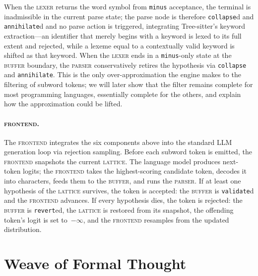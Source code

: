 \documentclass[11pt]{article}
\theoremstyle{plain}
\theoremstyle{definition}
\begin{document}
When the \textsc{lexer} returns the word symbol from \texttt{minus} acceptance,
the terminal is inadmissible in the current parse state; the parse node is
therefore \texttt{collapse}d and \texttt{annihilate}d and no parse action is
triggered, integrating Tree-sitter's keyword extraction---an identifier that
merely begins with a keyword is lexed to its full extent and rejected, while a
lexeme equal to a contextually valid keyword is shifted as that keyword. When
the \textsc{lexer} ends in a \texttt{minus}-only state at the \textsc{buffer}
boundary, the \textsc{parser} conservatively retires the hypothesis via
\texttt{collapse} and \texttt{annihilate}. This is the only over-approximation
the engine makes to the filtering of subword tokens; we will later show that the
filter remains complete for most programming languages, essentially complete for
the others, and explain how the approximation could be lifted.

\paragraph{\textsc{frontend}.} The \textsc{frontend} integrates the six
components above into the standard LLM generation loop via rejection sampling.
Before each subword token is emitted, the \textsc{frontend} snapshots the
current \textsc{lattice}. The language model produces next-token logits; the
\textsc{frontend} takes the highest-scoring candidate token, decodes it into
characters, feeds them to the \textsc{buffer}, and runs the \textsc{parser}. If
at least one hypothesis of the \textsc{lattice} survives, the token is
accepted: the \textsc{buffer} is \texttt{validate}d and the \textsc{frontend}
advances. If every hypothesis dies, the token is rejected: the \textsc{buffer}
is \texttt{revert}ed, the \textsc{lattice} is restored from its snapshot,
the offending token's logit is set to~\(-\infty\), and the \textsc{frontend}
resamples from the updated distribution.

\section{Weave of Formal Thought}
\label{sec:woft}
\end{document}
